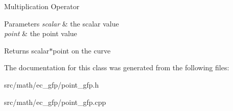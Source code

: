 Multiplication Operator 
\begin{DoxyParams}{Parameters}
{\em scalar} & the scalar value \\
\hline
{\em point} & the point value \\
\hline
\end{DoxyParams}
\begin{DoxyReturn}{Returns}
scalar$\ast$point on the curve 
\end{DoxyReturn}


The documentation for this class was generated from the following files\-:\begin{DoxyCompactItemize}
\item 
src/math/ec\-\_\-gfp/point\-\_\-gfp.\-h\item 
src/math/ec\-\_\-gfp/point\-\_\-gfp.\-cpp\end{DoxyCompactItemize}
